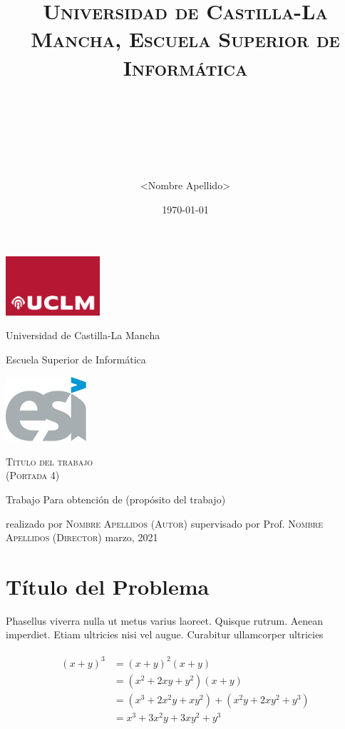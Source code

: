 \documentclass[paper=a4,fontsize=11pt]{scrartcl}
\title{	
\normalfont \normalsize 
\textsc{Universidad de Castilla-La Mancha, Escuela Superior de Informática} \\ [25pt]
\horrule{0.5pt} \\[0.4cm] %
\huge <Título de la Tarea> \\
\horrule{2pt} \\[0.5cm] %
}
\author{<Nombre Apellido>}
\date{\normalsize\today}
\numberwithin{equation}{section} %
\numberwithin{figure}{section}
\numberwithin{table}{section}
\begin{document}
\begin{titlepage}
    \centering %
	\includegraphics[width=3.5cm]{uclm_logo}
	\hfill
	\parbox{.5\linewidth}{%
		\centering
		{\LARGE Universidad de Castilla-La Mancha\par}
		\vspace{.05\textheight}
		{\large Escuela Superior de Informática\par}
	}
	\hfill
	\includegraphics[width=3cm]{esi_logo}
	\par
    \par\vspace{.15\textheight}
    {\huge\textsc{Título del trabajo \\
     (Portada 4)}\par}
    \Large
    \par\vspace{.1\textheight}
    Trabajo
    \medbreak
    Para obtención de
    (propósito del trabajo)
    \par\vspace{.08\textheight}
    realizado por
    \medbreak
    \textsc{Nombre Apellidos (Autor)}
    \bigbreak
    supervisado por
    \medbreak
    Prof. \textsc{Nombre Apellidos (Director)}
    \vfill
    \noindent%
    \small \hfill marzo, 2021 
\end{titlepage}


\section{Título del Problema}

Phasellus viverra nulla ut metus varius laoreet. Quisque rutrum. Aenean imperdiet. Etiam ultricies nisi vel augue. Curabitur ullamcorper ultricies

\begin{align} 
\begin{split}
(x+y)^3 	&= (x+y)^2(x+y)\\
&=(x^2+2xy+y^2)(x+y)\\
&=(x^3+2x^2y+xy^2) + (x^2y+2xy^2+y^3)\\
&=x^3+3x^2y+3xy^2+y^3
\end{split}					
\end{align}
\end{document}
